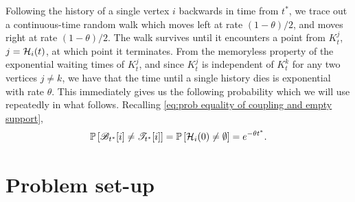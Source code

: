 	Following the history of a single vertex $i$ backwards in time from $t^*$, we trace out a continuous-time random walk which moves left at rate $(1 - \theta)/2$, and moves right at rate $(1 - \theta)/2$. The walk survives until it encounters a point from $K_t^j$, $j = \mathcal{H}_i(t)$, at which point it terminates. From the memoryless property of the exponential waiting times of $K_t^j$, and since $K_t^j$ is independent of $K_t^k$ for any two vertices $j \neq k$, we have that the time until a single history dies is exponential with rate $\theta$.
	This immediately gives us the following probability which we will use repeatedly in what follows. Recalling \eqref{eq:prob equality of coupling and empty support},
	\begin{equation}
		\mathbb{P} \left[ \mathscr{B}_{t^*}[i] \neq \mathscr{T}_{t^*}[i] \right] = 
		\mathbb{P} \left[ \mathcal{H}_i(0) \neq \emptyset \right] = 
		e^{-\theta t^*}.
		\label{eq:1D bernoulli prob}
	\end{equation}

	\section{Problem set-up}
	\label{sec:1D problem setup}



